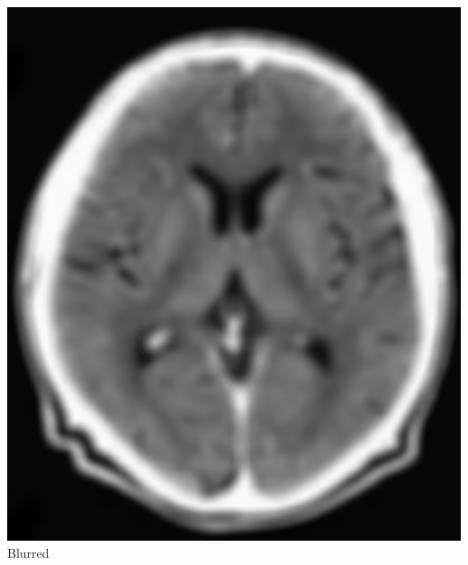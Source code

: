 \begin{frame}
\begin{columns}[onlytextwidth]
\begin{column}{0.5\textwidth}
            \includegraphics[height=0.8\textheight]{img/brain_gauss}\\Blurred
        \end{column}
    \end{columns}
\end{frame}




